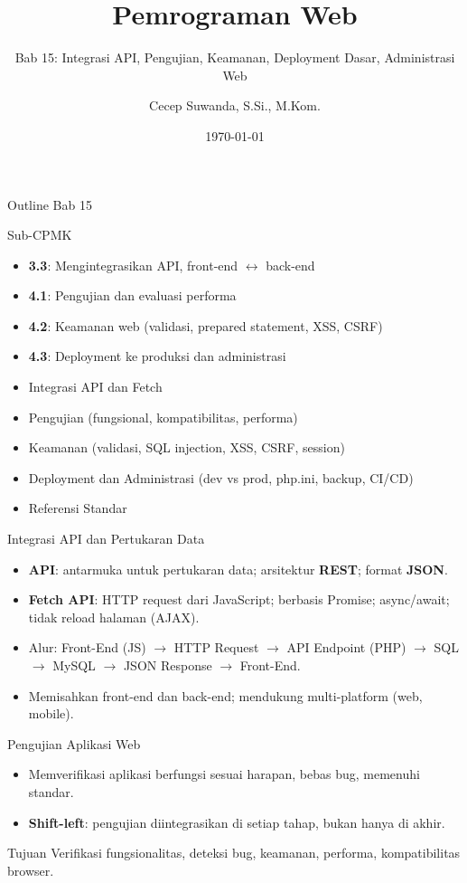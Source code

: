 \documentclass[handout]{beamer}
\title[Bab 15 -- Integrasi \& Deployment]{Pemrograman Web}
\subtitle{Bab 15: Integrasi API, Pengujian, Keamanan, Deployment Dasar, Administrasi Web}
\author{Cecep Suwanda, S.Si., M.Kom.}
\institute{Universitas Bale Bandung}
\date{\today}
\begin{document}
\begin{frame}
	\titlepage
\end{frame}

\begin{frame}[shrink=15]{Outline Bab 15}
	\begin{block}{Sub-CPMK}
		\begin{itemize}
			\item \textbf{3.3}: Mengintegrasikan API, front-end $\leftrightarrow$ back-end
			\item \textbf{4.1}: Pengujian dan evaluasi performa
			\item \textbf{4.2}: Keamanan web (validasi, prepared statement, XSS, CSRF)
			\item \textbf{4.3}: Deployment ke produksi dan administrasi
		\end{itemize}
	\end{block}
	\begin{itemize}
		\item Integrasi API dan Fetch
		\item Pengujian (fungsional, kompatibilitas, performa)
		\item Keamanan (validasi, SQL injection, XSS, CSRF, session)
		\item Deployment dan Administrasi (dev vs prod, php.ini, backup, CI/CD)
		\item Referensi Standar
	\end{itemize}
\end{frame}

\begin{frame}{Integrasi API dan Pertukaran Data}
	\begin{itemize}
		\item \textbf{API}: antarmuka untuk pertukaran data; arsitektur \textbf{REST}; format \textbf{JSON}.
		\item \textbf{Fetch API}: HTTP request dari JavaScript; berbasis Promise; async/await; tidak reload halaman (AJAX).
		\item Alur: Front-End (JS) $\to$ HTTP Request $\to$ API Endpoint (PHP) $\to$ SQL $\to$ MySQL $\to$ JSON Response $\to$ Front-End.
		\item Memisahkan front-end dan back-end; mendukung multi-platform (web, mobile).
	\end{itemize}
\end{frame}

\begin{frame}{Pengujian Aplikasi Web}
	\begin{itemize}
		\item Memverifikasi aplikasi berfungsi sesuai harapan, bebas bug, memenuhi standar.
		\item \textbf{Shift-left}: pengujian diintegrasikan di setiap tahap, bukan hanya di akhir.
	\end{itemize}
	\begin{block}{Tujuan}
		Verifikasi fungsionalitas, deteksi bug, keamanan, performa, kompatibilitas browser.
	\end{block}
\end{frame}
\end{document}
